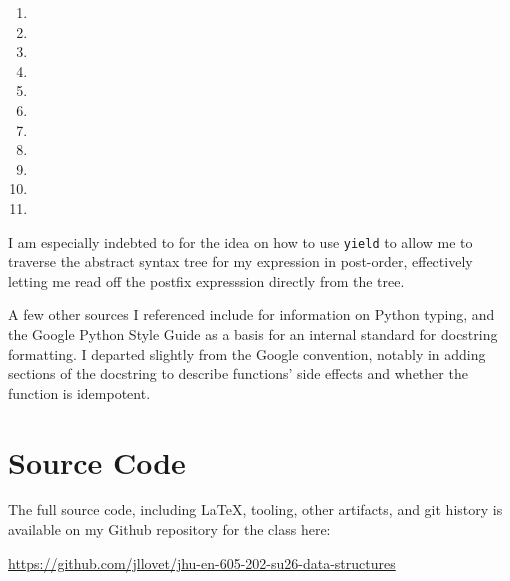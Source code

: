 \documentclass[10pt,letterpaper,final]{report}
\begin{document}
\begin{enumerate}
  \item {}
  \item {}
  \item {}
  \item {}
  \item {}
  \item {}
  \item {}
  \item {}
  \item {}
  \item {}
  \item {}
\end{enumerate}

I am especially indebted to \textcite{Martinheinzdev2023LazyEvaluationUsing} for the idea on how to use \texttt{yield} to allow me to traverse the abstract syntax tree for my expression in post-order, effectively letting me read off the postfix expresssion directly from the tree.

A few other sources I referenced include \textcite{PythonDocumentationTypingLiterals} for information on Python typing, and the Google Python Style Guide \textcite{GooglePythonStyleGuide} as a basis for an internal standard for docstring formatting. I departed slightly from the Google convention, notably in adding sections of the docstring to describe functions' side effects and whether the function is idempotent.

\pagebreak

\section{Source Code}
The full source code, including LaTeX, tooling, other artifacts, and git history is available on my Github repository for the class here:
\begin{center}
  \url{https://github.com/jllovet/jhu-en-605-202-su26-data-structures}
\end{center}

\printbibliography[heading=bibintoc]
\end{document}
